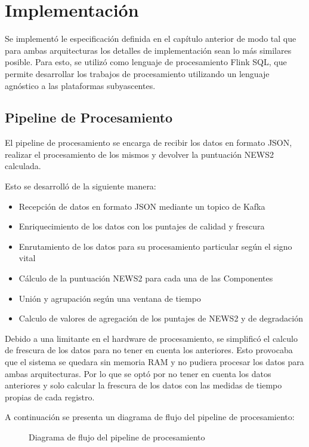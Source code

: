 \section{Implementación}

Se implementó le especificación definida en el capítulo anterior de modo tal que para ambas arquitecturas los detalles de implementación sean lo más similares posible.
Para esto, se utilizó como lenguaje de procesamiento Flink SQL, que permite desarrollar los trabajos de procesamiento utilizando un lenguaje agnóstico a las plataformas subyascentes. 

\subsection{Pipeline de Procesamiento}
El pipeline de procesamiento se encarga de recibir los datos en formato JSON,
realizar el procesamiento de los mismos y devolver la puntuación NEWS2 calculada.

Esto se desarrolló de la siguiente manera:
\begin{itemize}
    \item Recepción de datos en formato JSON mediante un topico de Kafka
    \item Enriquecimiento de los datos con los puntajes de calidad y frescura
    \item Enrutamiento de los datos para su procesamiento particular según el signo vital
    \item Cálculo de la puntuación NEWS2 para cada una de las Componentes
    \item Unión y agrupación según una ventana de tiempo
    \item Calculo de valores de agregación de los puntajes de NEWS2 y de degradación
\end{itemize}

Debido a una limitante en el hardware de procesamiento, se simplificó el calculo de frescura de los datos para no tener en cuenta los anteriores. 
Esto provocaba que el sistema se quedara sin memoria RAM y no pudiera procesar los datos para ambas arquitecturas. 
Por lo que se optó por no tener en cuenta los datos anteriores y solo calcular la frescura de los datos con las medidas de tiempo propias de cada registro.

\newpage
A continuación se presenta un diagrama de flujo del pipeline de procesamiento:
\begin{figure}[h]
    \caption{Diagrama de flujo del pipeline de procesamiento}
    \label{fig:flowchart}
\end{figure}

